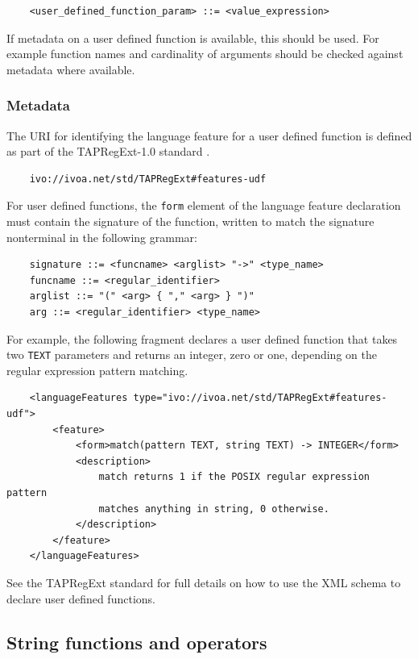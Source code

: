 \documentclass[11pt,a4paper]{ivoa}
\begin{document}
\begin{verbatim}
    <user_defined_function_param> ::= <value_expression>
\end{verbatim}

If metadata on a user defined function is available, this should be used. For
example function names and cardinality of arguments should be checked against
metadata where available.

\subsubsection{Metadata}
\label{sec:user.metadata}

The URI for identifying the language feature for a user defined function
is defined as part of the TAPRegExt-1.0 standard \citep{std:TAPREGEXT}.

\begin{verbatim}
    ivo://ivoa.net/std/TAPRegExt#features-udf
\end{verbatim}

For user defined functions, the \verb:form: element of the language feature
declaration must contain the signature of the function, written to match
the signature nonterminal in the following grammar:

\begin{verbatim}
    signature ::= <funcname> <arglist> "->" <type_name>
    funcname ::= <regular_identifier>
    arglist ::= "(" <arg> { "," <arg> } ")"
    arg ::= <regular_identifier> <type_name>
\end{verbatim}

For example, the following fragment declares a user defined function that
takes two \verb:TEXT: parameters and returns an integer, zero or one,
depending on the regular expression pattern matching.

\begin{verbatim}
    <languageFeatures type="ivo://ivoa.net/std/TAPRegExt#features-udf">
        <feature>
            <form>match(pattern TEXT, string TEXT) -> INTEGER</form>
            <description>
                match returns 1 if the POSIX regular expression pattern
                matches anything in string, 0 otherwise.
            </description>
        </feature>
    </languageFeatures>
\end{verbatim}

See the TAPRegExt standard for full details on how to use the
XML schema to declare user defined functions.

\subsection{String functions and operators}
\label{sec:string.functions}
\end{document}
